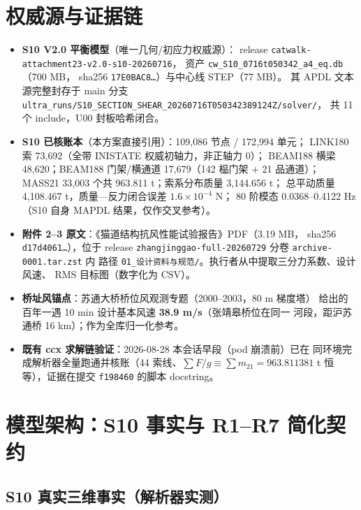 \documentclass[11pt,a4paper]{ctexart}
\begin{document}
\section{权威源与证据链}

\begin{itemize}
  \item \textbf{S10 V2.0 平衡模型}（唯一几何/初应力权威源）：
        release \texttt{catwalk-attachment23-v2.0-s10-20260716}，
        资产 \texttt{cw\_S10\_0716t050342\_a4\_eq.db}（700 MB，
        sha256 \texttt{17E0BAC8\ldots}）与中心线 STEP（77 MB）。
        其 APDL 文本源完整封存于 main 分支
        \texttt{ultra\_runs/S10\_SECTION\_SHEAR\_20260716T050342389124Z/solver/}，
        共 11 个 include，U00 封板哈希闭合。
  \item \textbf{S10 已核账本}（本方案直接引用）：109{,}086 节点 / 172{,}994 单元；
        LINK180 索 73{,}692（全带 INISTATE 权威初轴力，非正轴力 0）；
        BEAM188 横梁 48{,}620；BEAM188 门架/横通道 17{,}679（142 榀门架 + 21 品通道）；
        MASS21 33{,}003 个共 963.811 t；索系分布质量 3{,}144.656 t；
        总平动质量 4{,}108.467 t，质量—反力闭合误差 $1.6\times10^{-4}$ N；
        80 阶模态 0.0368--0.4122 Hz（S10 自身 MAPDL 结果，仅作交叉参考）。
  \item \textbf{附件 2--3 原文}：《猫道结构抗风性能试验报告》PDF（3.19 MB，
        sha256 \texttt{d17d4061\ldots}），位于 release
        \texttt{zhangjinggao-full-20260729} 分卷 \texttt{archive-0001.tar.zst} 内
        路径 \texttt{01\_设计资料与规范/}。执行者从中提取三分力系数、设计风速、
        RMS 目标图（数字化为 CSV）。
  \item \textbf{桥址风锚点}：苏通大桥桥位风观测专题（2000--2003，80 m 梯度塔）
        给出的百年一遇 10 min 设计基本风速 \textbf{38.9 m/s}（张靖皋桥位在同一
        河段，距沪苏通桥 16 km）；作为全库归一化参考。
  \item \textbf{既有 ccx 求解链验证}：2026-08-28 本会话早段（pod 崩溃前）已在
        同环境完成解析器全量跑通并核账（44 索线、$\sum F/g \equiv \sum m_{21}
        = 963.811381$ t 恒等），证据在提交 \texttt{f198460} 的脚本 docstring。
\end{itemize}

\section{模型架构：S10 事实与 R1--R7 简化契约}
\label{sec:model}

\subsection{S10 真实三维事实（解析器实测）}
\end{document}
